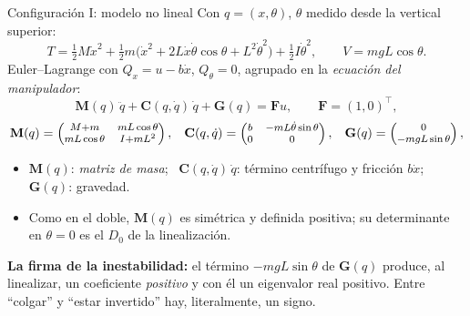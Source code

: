 \documentclass[aspectratio=169,11pt]{beamer}
\begin{document}
\begin{frame}{Configuración I: modelo no lineal}
  Con $q=(x,\theta)$, $\theta$ medido desde la vertical superior:
  \[
    T=\tfrac12 M\dot x^2
     +\tfrac12 m\bigl(\dot x^2+2L\dot x\dot\theta\cos\theta+L^2\dot\theta^2\bigr)
     +\tfrac12 I\dot\theta^2,
    \qquad V=mgL\cos\theta .
  \]
  Euler--Lagrange con $Q_x=u-b\dot x$, $Q_\theta=0$, agrupado en la
  \emph{ecuaci\'on del manipulador}:
  \[
    \mathbf{M}(q)\,\ddot q+\mathbf{C}(q,\dot q)\,\dot q+\mathbf{G}(q)=\bm F u,
    \qquad \bm F=(1,0)^\top,
  \]
  \vspace{-0.9em}
  \[
  {\footnotesize
  \mathbf{M}(q)=\begin{pmatrix} M{+}m & mL\cos\theta\\ mL\cos\theta & I{+}mL^2\end{pmatrix},\quad
  \mathbf{C}(q,\dot q)=\begin{pmatrix} b & -mL\dot\theta\sin\theta\\ 0 & 0\end{pmatrix},\quad
  \mathbf{G}(q)=\begin{pmatrix} 0\\ -mgL\sin\theta\end{pmatrix},}
  \]
  \vspace{-0.4em}
  \begin{itemize}
    \small
    \item $\mathbf{M}(q)$: \emph{matriz de masa}; \
          $\mathbf{C}(q,\dot q)\,\dot q$: t\'ermino centr\'ifugo y fricci\'on
          $b\dot x$; \ $\mathbf{G}(q)$: gravedad.
    \item Como en el doble, $\mathbf{M}(q)$ es sim\'etrica y definida positiva;
          su determinante en $\theta=0$ es el $D_0$ de la linealizaci\'on.
  \end{itemize}
  \begin{cajaclave}
    \small \textbf{La firma de la inestabilidad:} el t\'ermino $-mgL\sin\theta$
    de $\mathbf{G}(q)$ produce, al linealizar, un coeficiente \emph{positivo} y
    con \'el un eigenvalor real positivo. Entre ``colgar'' y ``estar invertido''
    hay, literalmente, un signo.
  \end{cajaclave}
\end{frame}
\end{document}
